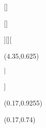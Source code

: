 {{\titleformat{\subsubsection}{\fontsize{11}\large\bfseries}{}{0pt}{{\thesubsubsection} \hspace{5pt} \bfseries}[\vspace{-1pt}]
}{
\titleformat{\section}{\fontsize{14}\large\bfseries\textcolor{\titleschemecolor}}{}{0pt}{\textcolor{\titleschemecolor}{\thesection} \hspace{3pt} \bfseries}%

\titleformat{\subsection}{\fontsize{13}\linespread\large\bfseries}{}{0pt}{%
	}[]%
\titlespacing*{\subsection}{0pt}{25pt}{10pt}

\titleformat{\subsubsection}{\fontsize{11}\linespread\large\bfseries}{}{0pt}{
	}[\vspace{-1pt}]

}

\sethead[
\makebox(\hbh, \hbl)[b]{
\colorbox{\boxcolor}{\makebox(\hbh, \hbl)[b]{\Large \bfseries  \textcolor{\boxtextcolor} \evenboxcontent \vspace{5pt} }}}
\hspace{3pt}
\iftoggle{headrule}{
\color{\rulecolor}\titlerule[\rulewidth]
}{}
][][
\begin{textblock}{2}(4.35,0.625)
\begin{flushright}
	\large \bfseries \textcolor{\titleschemecolor}{ \thesection \hspace{4pt} $|$ \hspace{1.5pt} \sectiontitle }
\end{flushright}
\end{textblock}
]
{
\begin{textblock}{5.801}(0.17,0.9255)
\iftoggle{headrule}{ %
	\vspace{-1pt} \color{\rulecolor}\titlerule[\rulewidth] 
}{}
\end{textblock}
\begin{textblock}{2}(0.17,0.74)
\large \bfseries \textcolor{\titleschemecolor}\doctype
\end{textblock}


}}
